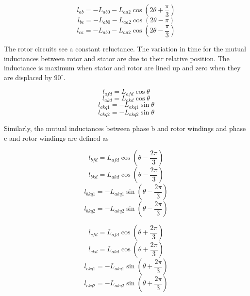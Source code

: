 \begin{equation} \label{eq:MutualInductanceAB}
	l_{ab} = -L_{ab0} - L_{aa2} \cos (2 \theta + \frac{\pi}{3})
\end{equation}
\begin{equation} \label{eq:MutualInductanceBC}
	l_{bc} = -L_{ab0} - L_{aa2} \cos (2 \theta - \pi)
\end{equation}
\begin{equation} \label{eq:MutualInductanceCA}
	l_{ca} = - L_{ab0} - L_{aa2} \cos (2 \theta - \frac{\pi}{3})
\end{equation}

The rotor circuits see a constant reluctance. The variation in time for the mutual inductances between rotor and stator are due to their relative position. The inductance is maximum when stator and rotor are lined up and zero when they are displaced by $90^{\circ}$.


\begin{equation}
	l_{afd} = L_{afd} \cos \theta
\end{equation}
\begin{equation}
	l_{akd} = L_{akd} \cos \theta
\end{equation}
\begin{equation}
	l_{akq1} = - L_{akq1} \sin \theta
\end{equation}
\begin{equation}
	l_{akq2} = - L_{akq2} \sin \theta
\end{equation}


Similarly, the mutual inductances between phase b and rotor windings and phase c and rotor windings are defined as

\begin{equation}
	l_{bfd} = L_{afd} \cos (\theta - \dfrac{2 \pi}{3})
\end{equation}
\begin{equation}
	l_{bkd} = L_{akd} \cos (\theta - \dfrac{2 \pi}{3})
\end{equation}
\begin{equation}
	l_{bkq1} = - L_{akq1} \sin (\theta - \dfrac{2 \pi}{3})
\end{equation}
\begin{equation}
	l_{bkq2} = - L_{akq2} \sin (\theta - \dfrac{2 \pi}{3})
\end{equation}

\begin{equation}
	l_{cfd} = L_{afd} \cos (\theta + \dfrac{2 \pi}{3})
\end{equation}
\begin{equation}
	l_{ckd} = L_{akd} \cos (\theta + \dfrac{2 \pi}{3})
\end{equation}
\begin{equation}
	l_{ckq1} = - L_{akq1} \sin (\theta + \dfrac{2 \pi}{3})
\end{equation}
\begin{equation}
	l_{ckq2} = - L_{akq2} \sin (\theta + \dfrac{2 \pi}{3})
\end{equation}

